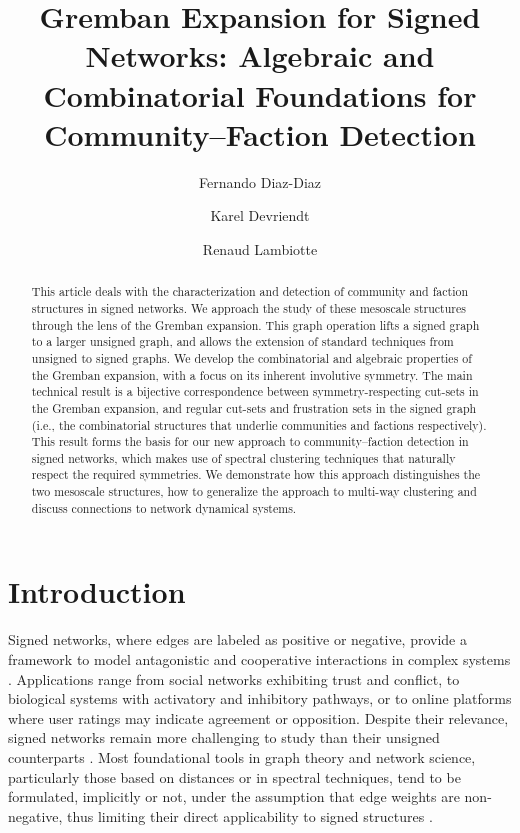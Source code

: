 \documentclass[reprint,onecolumn]{article}
\date{}
\newcommand{\1}{\mathbb{1}}
\newcommand{\0}{\mathbf{0}}
\begin{document}
\title{Gremban Expansion for Signed Networks: Algebraic and Combinatorial Foundations for Community--Faction Detection}
\author[1,2]{Fernando Diaz-Diaz}
\author[3]{Karel Devriendt}
\author[3]{Renaud Lambiotte}
\date{}

\maketitle
\begin{abstract}
This article deals with the characterization and detection of community and faction structures in signed networks. We approach the study of these mesoscale structures through the lens of the Gremban expansion. This graph operation lifts a signed graph to a larger unsigned graph, and allows the  extension of standard techniques from unsigned to signed graphs. We  develop the combinatorial and algebraic properties of the Gremban expansion, with a focus on its inherent involutive symmetry. The main technical result is a bijective correspondence between symmetry-respecting cut-sets in the Gremban expansion, and regular cut-sets and frustration sets in the signed graph (i.e., the combinatorial structures that underlie communities and factions respectively). This result forms the basis for our new approach to community--faction detection in signed networks, which makes use of spectral clustering techniques that naturally respect the required symmetries. We demonstrate how this approach distinguishes the two mesoscale structures, how to generalize the approach to multi-way clustering  and discuss connections to network dynamical systems. 
\end{abstract}


\section{Introduction}

Signed networks, where edges are labeled as positive or negative, provide a framework to model antagonistic and cooperative interactions in complex systems \cite{altafini2012consensus,diaz2024mathematical,leskovec2010signed,szell2010multirelational}. Applications range from social networks exhibiting trust and conflict, to biological systems with activatory and inhibitory pathways, or to online platforms where user ratings may indicate agreement or opposition. Despite their relevance, signed networks remain more challenging to study than their unsigned counterparts \cite{traag2019partitioning}. Most foundational tools in graph theory and network science, particularly those based on distances or in spectral techniques, tend to be formulated, implicitly or not, under the assumption that edge weights are non-negative, thus limiting their direct applicability to signed structures \cite{diaz2025signed}.
\end{document}
